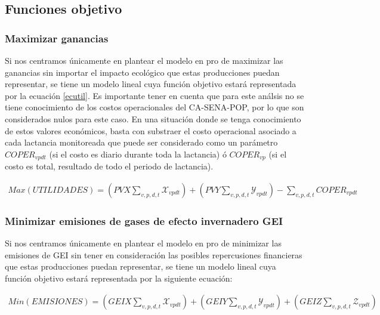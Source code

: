 \subsection{Funciones objetivo}
\subsubsection{Maximizar ganancias}
Si nos centramos únicamente en plantear el modelo en pro de maximizar las ganancias sin importar el impacto ecológico que estas producciones puedan representar, se tiene un modelo lineal cuya función objetivo estará representada por la ecuación \ref{ecutil}. Es importante tener en cuenta que para este análsis no se tiene conocimiento de los costos operacionales del CA-SENA-POP, por lo que son considerados nulos para este caso.
En una situación donde se tenga conocimiento de estos valores económicos, basta con substraer el costo operacional asociado a cada lactancia monitoreada que puede ser considerado como un parámetro $COPER_{vpdt}$ (si el costo es diario durante toda la lactancia) ó $COPER_{vp}$ (si el costo es total, resultado de todo el periodo de lactancia).

\begin{equation}\label{ecutil}
\begin{split}
    Max(UTILIDADES) =\left(PVX\sum_{v,p,d,t}\mathcal{X}_{vpdt}\right) + \left(PVY\sum_{v,p,d,t}\mathcal{Y}_{vpdt} \right) - \sum_{v,p,d,t}COPER_{vpdt}
\end{split}
\end{equation}

\subsubsection{Minimizar emisiones de gases de efecto invernadero GEI}
Si nos centramos únicamente en plantear el modelo en pro de minimizar las emisiones de GEI sin tener en consideración las posibles repercusiones financieras que estas producciones puedan representar, se tiene un modelo lineal cuya función objetivo estará representada por la siguiente ecuación:

\begin{equation}\label{ecemis}
\begin{split}
    Min(EMISIONES) =\left( GEIX\sum_{v,p,d,t}\mathcal{X}_{vpdt}\right) + \left(GEIY\sum_{v,p,d,t}\mathcal{Y}_{vpdt}\right) + \left(GEIZ\sum_{v,p,d,t}\mathcal{Z}_{vpdt} \right)
\end{split}
\end{equation}

